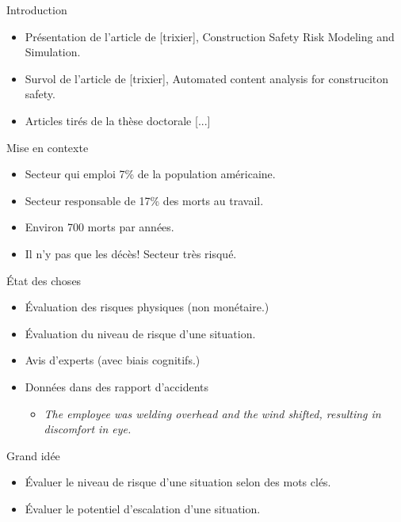 

\begin{frame}[label=intro]{Introduction}
	\begin{itemize}
		\item Présentation de l'article de [trixier], Construction Safety Risk Modeling and Simulation.
		\item Survol de l'article de [trixier], Automated content analysis for construciton safety.	
		\item Articles tirés de la thèse doctorale [...]
	\end{itemize}
	\end{frame}


\begin{frame}[label=intro]{Mise en contexte}
	\begin{itemize}
		\item Secteur qui emploi 7\% de la population américaine.
		\item Secteur responsable de 17\% des morts au travail.
		\item Environ 700 morts par années.
		\item Il n'y pas que les décès! Secteur très risqué.
	\end{itemize}
	\end{frame}


\begin{frame}[label=intro]{État des choses}
	\begin{itemize}
			\item Évaluation des risques physiques (non monétaire.)
		\item Évaluation du niveau de risque d'une situation.
		\item Avis d'experts (avec biais cognitifs.)
		\item Données dans des rapport d'accidents	
			\begin{itemize}
				\item \textit{The employee was welding overhead and the wind shifted, resulting in discomfort in eye.}
			\end{itemize}
				
	\end{itemize}
\end{frame}


\begin{frame}[label=intro]{Grand idée}
	\begin{itemize}
		\item Évaluer le niveau de risque d'une situation selon des mots clés.
		\item Évaluer le potentiel d'escalation d'une situation.
	\end{itemize}
\end{frame}


